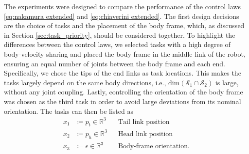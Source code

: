 \documentclass[../main.tex]{subfiles}
\begin{document}
The experiments were designed to compare the performance of the control laws \eqref{eq:nakamura extended} and \eqref{eq:chiaverini extended}. The first design decisions are the choice of tasks and the placement of the body frame, which, as discussed in Section \ref{sec:task_priority}, should be considered together. To highlight the differences between the control laws, we selected tasks with a high degree of body-velocity sharing and placed the body frame in the middle link of the robot, ensuring an equal number of joints between the body frame and each end. Specifically, we chose the tips of the end links as task locations. This makes the tasks largely depend on the same body directions, i.e., \( \mathrm{dim}(\mathcal{S}_1 \cap \mathcal{S}_2) \) is large, without any joint coupling. Lastly, controlling the orientation of the body frame was chosen as the third task in order to avoid large deviations from its nominal orientation. The tasks can then be listed as
\begin{subequations}
\begin{align}
    x_1 &\coloneqq p_t \in \mathbb{R}^3 &&\text{Tail link position}\\
    x_2 &\coloneqq p_h \in \mathbb{R}^3 &&\text{Head link position}\\
    x_3 &\coloneqq \epsilon \in \mathbb{R}^3 &&\text{Body-frame orientation}.
\end{align}
\end{subequations}

\end{document}

